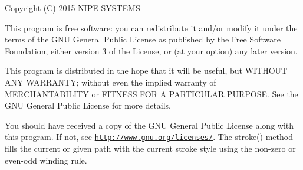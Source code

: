 Copyright (C) 2015 N\+I\+P\+E-\/\+S\+Y\+S\+T\+E\+M\+S

This program is free software\+: you can redistribute it and/or modify it under the terms of the G\+N\+U General Public License as published by the Free Software Foundation, either version 3 of the License, or (at your option) any later version.

This program is distributed in the hope that it will be useful, but W\+I\+T\+H\+O\+U\+T A\+N\+Y W\+A\+R\+R\+A\+N\+T\+Y; without even the implied warranty of M\+E\+R\+C\+H\+A\+N\+T\+A\+B\+I\+L\+I\+T\+Y or F\+I\+T\+N\+E\+S\+S F\+O\+R A P\+A\+R\+T\+I\+C\+U\+L\+A\+R P\+U\+R\+P\+O\+S\+E. See the G\+N\+U General Public License for more details.

You should have received a copy of the G\+N\+U General Public License along with this program. If not, see \href{http://www.gnu.org/licenses/}{\tt http\+://www.\+gnu.\+org/licenses/}. The stroke() method fills the current or given path with the current stroke style using the non-\/zero or even-\/odd winding rule. 